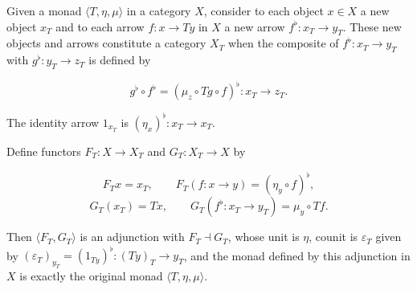 Given a monad $\langle T, \eta, \mu \rangle$ in a category $X$, consider to each object $x \in X$ a new object $x_T$ and to each arrow $f : x \to Ty$ in $X$ a new arrow $f^\flat : x_T \to y_T$. These new objects and arrows constitute a category $X_T$ when the composite of $f^\flat : x_T \to y_T$ with $g^\flat : y_T \to z_T$ is defined by

$$g^\flat \circ f^\flat = (\mu_z \circ Tg \circ f)^\flat : x_T \to z_T.$$

The identity arrow $1_{x_T}$ is $(\eta_x)^\flat : x_T \to x_T$.

Define functors $F_T : X \to X_T$ and $G_T : X_T \to X$ by

$$F_T x = x_T, \qquad F_T(f : x \to y) = (\eta_y \circ f)^\flat,$$
$$G_T(x_T) = Tx, \qquad G_T(f^\flat : x_T \to y_T) = \mu_y \circ Tf.$$

Then $\langle F_T, G_T \rangle$ is an adjunction with $F_T \dashv G_T$, whose unit is $\eta$, counit is $\varepsilon_T$ given by $(\varepsilon_T)_{y_T} = (1_{Ty})^\flat : (Ty)_T \to y_T$, and the monad defined by this adjunction in $X$ is exactly the original monad $\langle T, \eta, \mu \rangle$.
